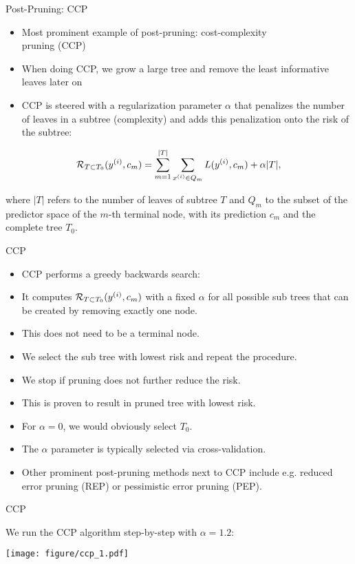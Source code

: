 \documentclass[11pt,compress,t,notes=noshow, xcolor=table]{beamer}
\begin{document}
\begin{vbframe}{Post-Pruning: CCP}
\begin{itemize}
\item Most prominent example of post-pruning: cost-complexity \\ pruning (CCP)
\item When doing CCP, we grow a large tree and remove the least informative leaves later on
\item CCP is steered with a regularization parameter $\alpha$ that penalizes the number of leaves in a subtree (complexity) and adds this penalization onto the risk of the subtree:
\end{itemize}

$$\mathcal{R}_{T \subset T_0}(y^{(i)}, c_m) = \sum_{m=1}^{|T|} \sum_{x^{(i)} \in Q_m} L(y^{(i)}, c_m) + \alpha |T|,$$

where $|T|$ refers to the number of leaves of subtree $T$ and $Q_m$ to the subset of the predictor space of the $m$-th terminal node, with its prediction $c_m$ and the complete tree $T_0$.

\end{vbframe}

\begin{vbframe}{CCP}
\begin{itemize}
\item CCP performs a greedy backwards search:
\item It computes $\mathcal{R}_{T \subset T_0}(y^{(i)}, c_m)$ with a fixed $\alpha$ for all possible sub trees that can be created by removing exactly one node.
\item This does not need to be a terminal node.
\item We select the sub tree with lowest risk and repeat the procedure.
\item We stop if pruning does not further reduce the risk.
\item This is proven to result in pruned tree with lowest risk.
\item For $\alpha = 0$, we would obviously select $T_0$.
\item The $\alpha$ parameter is typically selected via cross-validation.
\item Other prominent post-pruning methods next to CCP include e.g. reduced error pruning (REP) or pessimistic error pruning (PEP).
\end{itemize}
\end{vbframe}


\begin{frame}{CCP}

We run the CCP algorithm step-by-step with $\alpha = 1.2$:
\vspace{0.25cm}

\color{fgcolor}

{\centering \texttt{[image: figure/ccp\_1.pdf]} 

}

\end{frame}
\end{document}
